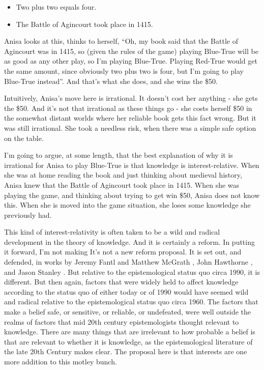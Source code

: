 \documentclass[
  11pt,
]{book}
\providecommand{\tightlist}{%
  \setlength{\itemsep}{0pt}\setlength{\parskip}{0pt}}
\begin{document}
\begin{itemize}
\tightlist
\item
  Two plus two equals four.
\item
  The Battle of Agincourt took place in 1415.
\end{itemize}

Anisa looks at this, thinks to herself, ``Oh, my book said that the Battle of Agincourt was in 1415, so (given the rules of the game) playing Blue-True will be as good as any other play, so I'm playing Blue-True. Playing Red-True would get the same amount, since obviously two plus two is four, but I'm going to play Blue-True instead''. And that's what she does, and she wins the \$50.

Intuitively, Anisa's move here is irrational. It doesn't cost her anything - she gets the \$50. And it's not that irrational as these things go - she costs herself \$50 in the somewhat distant worlds where her reliable book gets this fact wrong. But it was still irrational. She took a needless risk, when there was a simple safe option on the table.

I'm going to argue, at some length, that the best explanation of why it is irrational for Anisa to play Blue-True is that knowledge is interest-relative. When she was at home reading the book and just thinking about medieval history, Anisa knew that the Battle of Agincourt took place in 1415. When she was playing the game, and thinking about trying to get win \$50, Anisa does not know this. When she is moved into the game situation, she loses some knowledge she previously had.

This kind of interest-relativity is often taken to be a wild and radical development in the theory of knowledge. And it is certainly a reform. In putting it forward, I'm not making It's not a new reform proposal. It is set out, and defended, in works by Jeremy Fantl and Matthew McGrath \citetext{\citeyear{FantlMcGrath2002}; \citeyear{FantlMcGrath2009}}, John Hawthorne \citeyearpar{Hawthorne2004}, and Jason Stanley \citeyearpar{Stanley2005}. But relative to the epistemological status quo circa 1990, it is different. But then again, factors that were widely held to affect knowledge according to the status quo of either today or of 1990 would have seemed wild and radical relative to the epistemological status quo circa 1960. The factors that make a belief safe, or sensitive, or reliable, or undefeated, were well outside the realms of factors that mid 20th century epistemologists thought relevant to knowledge. There are many things that are irrelevant to how probable a belief is that are relevant to whether it is knowledge, as the epistemological literature of the late 20th Century makes clear. The proposal here is that interests are one more addition to this motley bunch.
\end{document}
